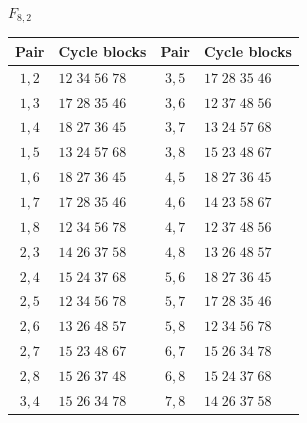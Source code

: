 \documentclass[11pt,a4paper]{article}
\theoremstyle{plain}
\theoremstyle{definition}
\numberwithin{equation}{section}
\begin{document}
\begin{center}\small
$F_{8,2}$\par\nopagebreak[4]\smallskip\nopagebreak[4]
\begin{tabular}{cl@{\qquad}cl}\toprule Pair&Cycle blocks&Pair&Cycle blocks\\\midrule
$1,2$ & $12\;34\;56\;78$ & $3,5$ & $17\;28\;35\;46$ \\
$1,3$ & $17\;28\;35\;46$ & $3,6$ & $12\;37\;48\;56$ \\
$1,4$ & $18\;27\;36\;45$ & $3,7$ & $13\;24\;57\;68$ \\
$1,5$ & $13\;24\;57\;68$ & $3,8$ & $15\;23\;48\;67$ \\
$1,6$ & $18\;27\;36\;45$ & $4,5$ & $18\;27\;36\;45$ \\
$1,7$ & $17\;28\;35\;46$ & $4,6$ & $14\;23\;58\;67$ \\
$1,8$ & $12\;34\;56\;78$ & $4,7$ & $12\;37\;48\;56$ \\
$2,3$ & $14\;26\;37\;58$ & $4,8$ & $13\;26\;48\;57$ \\
$2,4$ & $15\;24\;37\;68$ & $5,6$ & $18\;27\;36\;45$ \\
$2,5$ & $12\;34\;56\;78$ & $5,7$ & $17\;28\;35\;46$ \\
$2,6$ & $13\;26\;48\;57$ & $5,8$ & $12\;34\;56\;78$ \\
$2,7$ & $15\;23\;48\;67$ & $6,7$ & $15\;26\;34\;78$ \\
$2,8$ & $15\;26\;37\;48$ & $6,8$ & $15\;24\;37\;68$ \\
$3,4$ & $15\;26\;34\;78$ & $7,8$ & $14\;26\;37\;58$ \\
\bottomrule\end{tabular}
\end{center}
\end{document}
